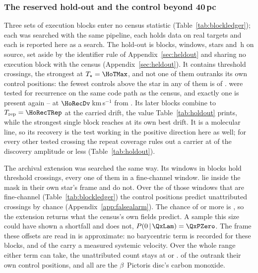 \subsubsection{The reserved hold-out and the control beyond 40\,pc}
\label{sec:holdoutsearch}

Three sets of execution blocks enter no census statistic
(Table~\ref{tab:blockledger}); each was searched with the same pipeline, each
holds data on real targets and each is reported here as a search. The hold-out is \HoNBlock{} blocks, \HoNWin{} windows, \HoNStar{} stars
and \HoHours\,h on source, set aside by the identifier rule of
Appendix~\ref{sec:heldout} and sharing no execution block with the census
(Appendix~\ref{sec:heldout}). It contains \HoNCross{} threshold crossings,
the strongest at $T_\star=\HoTMax$, and not one of them outranks its own
control positions: the fewest controls above the star in any of them is
\HoNCtrlMin{} of \NCtrl. \HoNTested{} were tested for recurrence on the same
code path as the census, and exactly one is present again -- \HoRecStar{} at
$\HoRecDv$\,km\,s$^{-1}$ from \HoRecLine. Its \HoRecNRep{} later blocks
combine to $T_{\rm rep}=\HoRecTRep$ at the carried drift, the value
Table~\ref{tab:holdout} prints, while the strongest single block reaches
\HoRecTAnyDrift{} at its own best drift. It is a molecular line, so its
recovery is the test working in the positive direction here as well; for
every other tested crossing the repeat coverage rules out a carrier at
\HoFracMax{} of the discovery amplitude or less (Table~\ref{tab:holdout}).

The archival extension was searched the same way. Its \LdgExtWin{} windows in
\LdgExtEB{} blocks hold \QxObsCross{} threshold crossings, every one of them
in a fine-channel window. \QxObsAttr{} lie inside the mask in their own
star's frame and \QxObsUnattr{} do not. Over the \QxNWinA{} of those windows that are
fine-channel (Table~\ref{tab:blockledger}) the
control positions predict \QxLam{} unattributed crossings by chance
(Appendix~\ref{app:falsealarm}). The chance of \QxObsUnattr{} or more is
\QxPGe, so the extension returns what the census's own fields predict.
A sample this size could have shown a
shortfall and does not, $P(0\,|\,\QxLam)=\QxPZero$. The frame these
offsets are read in is approximate: no barycentric term is recorded for
these blocks, and \QxNVsysCross{} of the \QxObsCross{} carry a measured
systemic velocity. Over the whole range either term can take, the
unattributed count stays at \QxObsUnattrLo{} or \QxObsUnattrHi.
\ExtNStageOne{} of the \QxObsCross{} outrank their own control positions,
and all \ExtNStageOne{} are the $\beta$~Pictoris disc's carbon monoxide.

